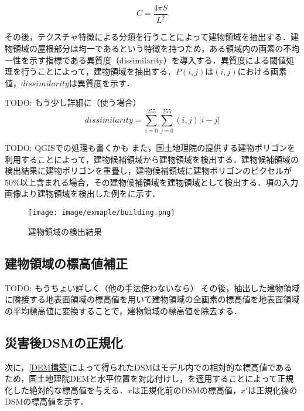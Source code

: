       \begin{equation}
        \label{円形度}
        C = \dfrac{4 \pi S} {L^2} 
      \end{equation}

      その後，テクスチャ特徴による分類を行うことによって建物領域を抽出する．建物領域の屋根部分は均一であるという特徴を持つため，ある領域内の画素の不均一性を示す指標である異質度（dissimilarity）\cite{異質度}を導入する．異質度による閾値処理を行うことによって，建物領域を抽出する．$P(i,j)$は$(i,j)$における画素値，$dissimilarity$は異質度を示す．

      TODO: もう少し詳細に（使う場合）
      \begin{equation}
        \label{異質度}
        dissimilarity = \sum_{i=0}^{255} \sum_{j=0}^{255} (i,j) |i-j|
      \end{equation}

      TODO: QGISでの処理も書くかも
      また，国土地理院の提供する建物ポリゴンを利用することによって，建物候補領域から建物領域を検出する．建物候補領域の検出結果に建物ポリゴンを重畳し，建物候補領域に建物ポリゴンのピクセルが50\%以上含まれる場合，その建物候補領域を建物領域として検出する．項の入力画像より建物領域を検出した例をに示す．

      \begin{figure}[t]
        \centering
        \texttt{[image: image/exmaple/building.png]}
        \caption{建物領域の検出結果}
        \label{建物領域検出}
      \end{figure}

    \subsection{建物領域の標高値補正}
    TODO: もうちょい詳しく（他の手法使わないなら）
      その後，抽出した建物領域に隣接する地表面領域の標高値を用いて建物領域の全画素の標高値を地表面領域の平均標高値に変換することで，建物領域の標高値を除去する．

    \subsection{災害後DSMの正規化}
      \label{災害後DSMの正規化}
      次に，\ref{DEM構築}によって得られたDSMはモデル内での相対的な標高値であるため，国土地理院DEMと水平位置を対応付けし，を適用することによって正規化した絶対的な標高値を与える．$x$は正規化前のDSMの標高値，$x'$は正規化後のDSMの標高値を示す．

